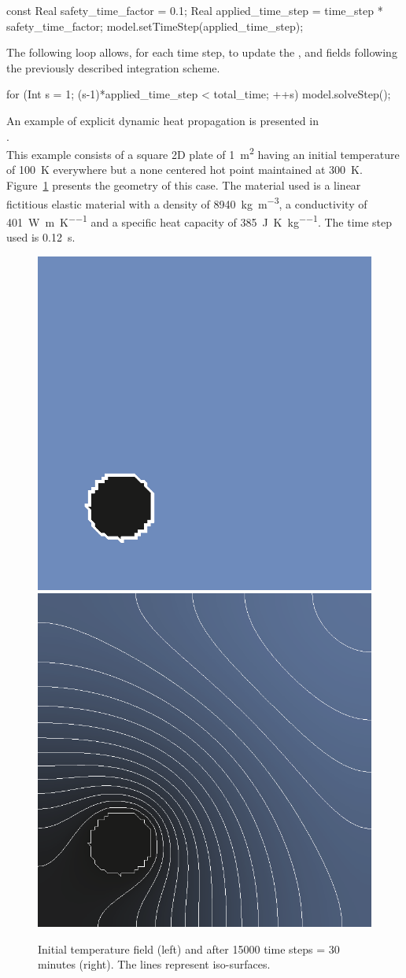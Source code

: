 \begin{cpp}
  const Real safety_time_factor = 0.1;
  Real applied_time_step = time_step * safety_time_factor;
  model.setTimeStep(applied_time_step);
\end{cpp}

The following loop  allows, for each time  step, to update the  ,  and
  fields  following the previously described integration scheme.

\begin{cpp}
  for (Int s = 1; (s-1)*applied_time_step < total_time; ++s) {
    model.solveStep();
  }
\end{cpp}

An    example    of    explicit     dynamic    heat propagation is    presented    in \\
.  \\
This example consists of a square 2D plate of \SI{1}{\metre^2}
having an initial temperature of \SI{100}{\kelvin} everywhere but a
none centered hot point maintained at
\SI{300}{\kelvin}. Figure~\ref{fig:htm:explicit:dynamic} presents
the geometry of this case. The material used is a linear fictitious
elastic material with a density of
\SI{8940}{\kilo\gram\per\metre^3}, a conductivity of
\SI{401}{\watt\per\metre\per\kelvin} and a specific heat capacity of
\SI{385}{\joule\per\kelvin\per\kilogram}. The time step used is
\SI{0.12}{\second}.

\begin{figure}[!htb]
  \centering
  \includegraphics[width=.4\textwidth]{figures/hot-point-1}
  \hfill
  \includegraphics[width=.4\textwidth]{figures/hot-point-2}
  \caption{Initial temperature field (left) and after 15000 time steps = 30 minutes (right). The lines represent iso-surfaces.}
  \label{fig:htm:explicit:dynamic}
\end{figure}

